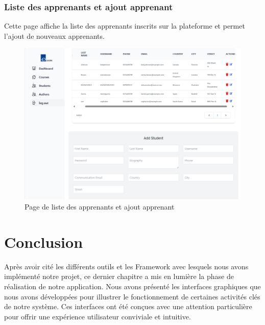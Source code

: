 \subsubsection{Liste des apprenants et ajout apprenant}

Cette page affiche la liste des apprenants inscrits sur la plateforme et permet l'ajout de nouveaux apprenants.

\begin{figure}[H]
    \centering
    \includegraphics[width=19cm]{Figures/addStudent.png}
    \caption{ Page de liste des apprenants et ajout apprenant}
\end{figure}

\newpage
\section*{Conclusion}

Après avoir cité les différents outils et les Framework avec lesquels nous avons implémenté notre projet, ce dernier chapitre a mis en lumière la phase de réalisation de notre application. Nous avons présenté les interfaces graphiques que nous avons développées pour illustrer le fonctionnement de certaines activités clés de notre système. Ces interfaces ont été conçues avec une attention particulière pour offrir une expérience utilisateur conviviale et intuitive.